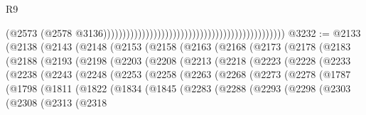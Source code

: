 \begin{lexlean}{R9}
\begin{coremodule}
                                                                                              (@2573
                                                                                                (@2578
                                                                                                  @3136)))))))))))))))))))))))))))))))))))))))))))))))
@3232 := @2133
    (@2138
      (@2143
        (@2148
          (@2153
            (@2158
              (@2163
                (@2168
                  (@2173
                    (@2178
                      (@2183
                        (@2188
                          (@2193
                            (@2198
                              (@2203
                                (@2208
                                  (@2213
                                    (@2218
                                      (@2223
                                        (@2228
                                          (@2233
                                            (@2238
                                              (@2243
                                                (@2248
                                                  (@2253
                                                    (@2258
                                                      (@2263
                                                        (@2268
                                                          (@2273
                                                            (@2278
                                                              (@1787
                                                                (@1798
                                                                  (@1811
                                                                    (@1822
                                                                      (@1834
                                                                        (@1845
                                                                          (@2283
                                                                            (@2288
                                                                              (@2293
                                                                                (@2298
                                                                                  (@2303
                                                                                    (@2308
                                                                                      (@2313
                                                                                        (@2318

\end{coremodule}
\end{lexlean}
